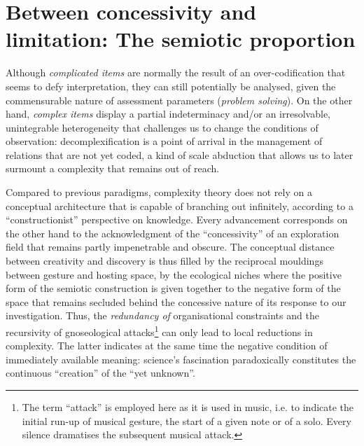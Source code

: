 \documentclass[output=paper]{langscibook}
\begin{document}
\section{Between concessivity and limitation: The semiotic proportion}\largerpage[2] %

Although \textit{complicated items} are normally the result of an over-codification that seems to defy interpretation, they can still potentially be analysed, given the commensurable nature of assessment parameters (\textit{problem solving}). On the other hand, \textit{complex items} display a partial indeterminacy and/or an irresolvable, unintegrable heterogeneity that challenges us to change the conditions of observation: decomplexification is a point of arrival in the management of relations that are not yet coded, a kind of scale abduction that allows us to later surmount a complexity that remains out of reach. 

Compared to previous paradigms, complexity theory does not rely on a conceptual architecture that is capable of branching out infinitely, according to a “constructionist” perspective on knowledge. Every advancement corresponds on the other hand to the acknowledgment of the “concessivity” of an exploration field that remains partly impenetrable and obscure. The conceptual distance between creativity and discovery is thus filled by the reciprocal mouldings between gesture and hosting space, by the ecological niches where the positive form of the semiotic construction is given together to the negative form of the space that remains secluded behind the concessive nature of its response to our investigation. Thus, the \textit{redundancy of} organisational constraints and the recursivity of gnoseological attacks{\footnote{The term “attack” is employed here as it is used in music, i.e. to indicate the initial run-up of musical gesture, the start of a given note or of a solo. Every silence dramatises the subsequent musical attack.}} can only lead to local reductions in complexity. The latter indicates at the same time the negative condition of immediately available meaning: science’s fascination paradoxically constitutes the continuous “creation” of the “yet unknown”. 
\end{document}
